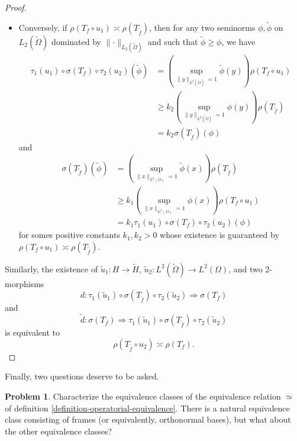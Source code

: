 \documentclass[a4paper,10pt]{article}
\theoremstyle{plain}
\theoremstyle{definition}
\newtheorem{problem}[theorem]{Problem}
\theoremstyle{remark}
\begin{document}
\begin{proof}
\begin{itemize}
    \item Conversely, if $\rho(T_f \circ  u_1) \asymp \rho(T_{\tilde{f}})$, then for any two seminorms $\phi,\tilde{\phi}$ on $L_2(\tilde{\Omega})$ dominated by $\lVert \cdot \rVert_{L_2(\tilde{\Omega})}$ and such that $\tilde{\phi} \geq \phi$, we have
          \begin{align*}
            \tau_1(u_1) \circ \sigma(T_f) \circ \tau_2(u_2) (\tilde{\phi}) & = \left( \underset{\lVert y \rVert_{L^2(\tilde{\Omega})} = 1}{\operatorname{sup}} \tilde{\phi}(y) \right) \rho(T_f \circ u_1) \\
                                                                           & \geq k_2  \left( \underset{\lVert y \rVert_{L^2(\tilde{\Omega})} = 1}{\operatorname{sup}} \phi(y) \right) \rho(T_{\tilde{f}}) \\
                                                                           & = k_2  \sigma(T_{\tilde{f}})(\phi)
          \end{align*}
          and
          \begin{align*}
            \sigma(T_{\tilde{f}})(\tilde{\phi}) & = \left( \underset{\lVert x \rVert_{L^2(\Omega)} = 1}{\operatorname{sup}}  \tilde{\phi}(x) \right) \rho(T_{\tilde{f}}) \\
                                                & \geq k_1 \left( \underset{\lVert x \rVert_{L^2(\Omega)} = 1}{\operatorname{sup}}  \phi(x) \right) \rho(T_f \circ  u_1) \\
                                                & = k_1 \tau_1(u_1) \circ \sigma(T_f) \circ \tau_2(u_2) (\phi)
          \end{align*}
          for somes positive constants $k_1,k_2 > 0$ whose existence is guaranteed by $\rho(T_f \circ  u_1) \asymp \rho(T_{\tilde{f}})$.
  \end{itemize}
  Similarly, the existence of $\tilde{u}_1 :  H \to \tilde{H}$, $\tilde{u}_2 : L^2(\tilde{\Omega}) \to L^2(\Omega)$, and two 2-morphisms
  \[ d : \tau_1(\tilde{u}_1) \circ \sigma(T_{\tilde{f}}) \circ \tau_2(\tilde{u}_2) \Rightarrow \sigma(T_f) \]
  and
  \[ \tilde{d} : \sigma(T_f)  \Rightarrow \tau_1(\tilde{u}_1) \circ \sigma(T_{\tilde{f}}) \circ \tau_2(\tilde{u}_2) \]
  is equivalent to
  \[ \rho(T_{\tilde{f}} \circ u_2) \asymp \rho(T_f). \]
\end{proof}

Finally, two questions deserve to be asked.

\begin{problem}
Characterize the equivalence classes of the equivalence relation $\simeq$ of definition \ref{definition-operatorial-equivalence}. There is a natural equivalence class consisting of frames (or equivalently, orthonormal bases), but what about the other equivalence classes? 
\end{problem}
\end{document}
